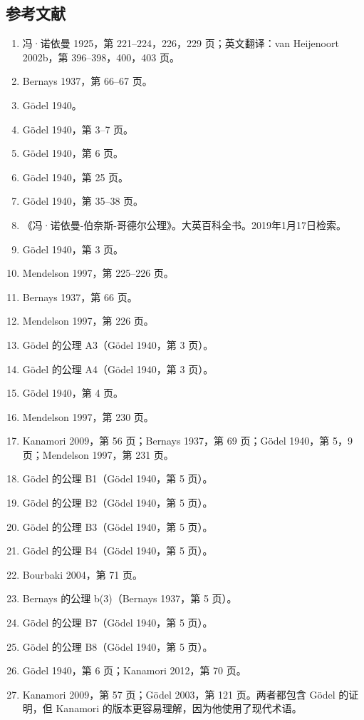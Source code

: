 \subsection{参考文献}  
\begin{enumerate}
\item 冯·诺依曼 1925，第 221–224，226，229 页；英文翻译：van Heijenoort 2002b，第 396–398，400，403 页。  
\item Bernays 1937，第 66–67 页。  
\item Gödel 1940。  
\item Gödel 1940，第 3–7 页。  
\item Gödel 1940，第 6 页。  
\item Gödel 1940，第 25 页。  
\item Gödel 1940，第 35–38 页。  
\item 《冯·诺依曼-伯奈斯-哥德尔公理》。大英百科全书。2019年1月17日检索。  
\item Gödel 1940，第 3 页。  
\item Mendelson 1997，第 225–226 页。  
\item Bernays 1937，第 66 页。  
\item Mendelson 1997，第 226 页。  
\item Gödel 的公理 A3（Gödel 1940，第 3 页）。  
\item Gödel 的公理 A4（Gödel 1940，第 3 页）。  
\item Gödel 1940，第 4 页。  
\item Mendelson 1997，第 230 页。  
\item Kanamori 2009，第 56 页；Bernays 1937，第 69 页；Gödel 1940，第 5，9 页；Mendelson 1997，第 231 页。  
\item Gödel 的公理 B1（Gödel 1940，第 5 页）。  
\item Gödel 的公理 B2（Gödel 1940，第 5 页）。  
\item Gödel 的公理 B3（Gödel 1940，第 5 页）。  
\item Gödel 的公理 B4（Gödel 1940，第 5 页）。  
\item Bourbaki 2004，第 71 页。  
\item Bernays 的公理 b(3)（Bernays 1937，第 5 页）。  
\item Gödel 的公理 B7（Gödel 1940，第 5 页）。  
\item Gödel 的公理 B8（Gödel 1940，第 5 页）。  
\item Gödel 1940，第 6 页；Kanamori 2012，第 70 页。  
\item Kanamori 2009，第 57 页；Gödel 2003，第 121 页。两者都包含 Gödel 的证明，但 Kanamori 的版本更容易理解，因为他使用了现代术语。  

\end{enumerate}
